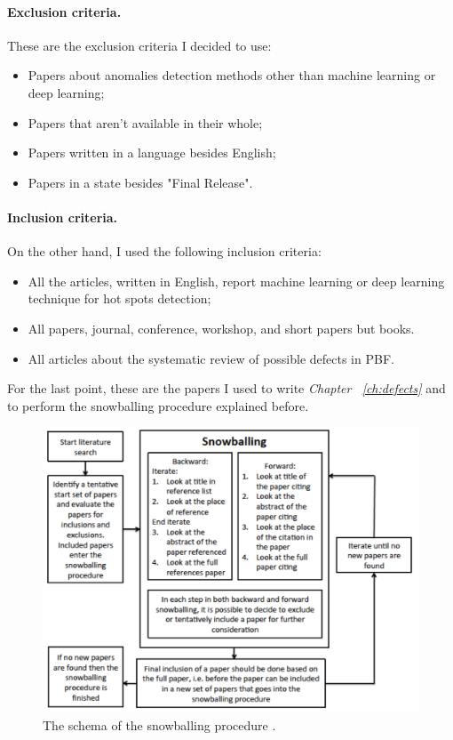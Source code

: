 \paragraph{Exclusion criteria.} These are the exclusion criteria I decided to use:
\begin{itemize}
    \item Papers about anomalies detection methods other than machine learning or deep learning;
    \item Papers that aren’t available in their whole;
    \item Papers written in a language besides English;
    \item Papers in a state besides "Final Release".
\end{itemize}
\paragraph{Inclusion criteria.} On the other hand, I used the following inclusion criteria:
\begin{itemize}
    \item All the articles, written in English, report machine learning or deep learning technique for  hot spots detection;
    \item All papers, journal, conference, workshop, and short papers but books.
    \item All articles about the systematic review of possible defects in PBF.
\end{itemize}
For the last point, these are the papers I used to write \emph{Chapter ~\ref{ch:defects}} and to perform the snowballing procedure explained before.

\begin{figure}
    \centering
    \includegraphics[scale=0.25]{Images/pallinadicoca.png}
    \caption[Snowballing procedure.] {The schema of the snowballing procedure \cite{wohlin_guidelines_2014}.}
    \label{fig:pallinacoca}
\end{figure}
